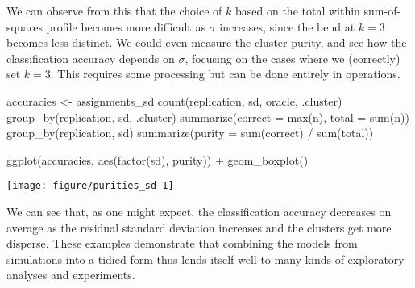 We can observe from this that the choice of $k$ based on the total within sum-of-squares profile becomes more difficult as $\sigma$ increases, since the bend at $k=3$ becomes less distinct. We could even measure the cluster purity, and see how the classification accuracy depends on $\sigma$, focusing on the cases where we (correctly) set $k=3$. This requires some processing but can be done entirely in  operations.

\begin{center}

\begin{example}
accuracies <- assignments_sd %
    count(replication, sd, oracle, .cluster) %
    group_by(replication, sd, .cluster) %
    summarize(correct = max(n), total = sum(n)) %
    group_by(replication, sd) %
    summarize(purity = sum(correct) / sum(total))
\end{example}

\begin{example}
ggplot(accuracies, aes(factor(sd), purity)) + geom_boxplot()
\end{example}

\texttt{[image: figure/purities\_sd-1]} 
\end{center}

We can see that, as one might expect, the classification accuracy decreases on average as the residual standard deviation increases and the clusters get more disperse. These examples demonstrate that combining the models from simulations into a tidied form thus lends itself well to many kinds of exploratory analyses and experiments.

